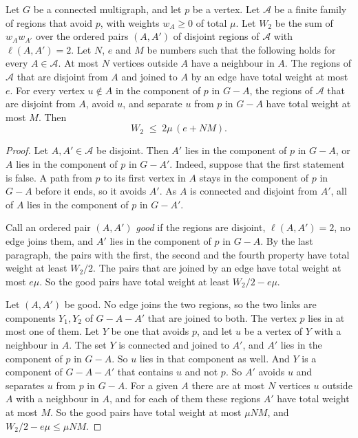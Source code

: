 \begin{lemma}\label{lem:sep}
Let $G$ be a connected multigraph, and let $p$ be a vertex. Let $\mathcal A$ be a finite family of
regions that avoid $p$, with weights $w_A\ge0$ of total $\mu$. Let $W_2$ be the sum of
$w_Aw_{A'}$ over the ordered pairs $(A,A')$ of disjoint regions of $\mathcal A$ with
$\ell(A,A')=2$. Let $N$, $e$ and $M$ be numbers such that the following holds for every
$A\in\mathcal A$. At most $N$ vertices outside $A$ have a neighbour in $A$. The regions of
$\mathcal A$ that are disjoint from $A$ and joined to $A$ by an edge have total weight at most
$e$. For every vertex $u\notin A$ in the component of $p$ in $G-A$, the regions of $\mathcal A$
that are disjoint from $A$, avoid $u$, and separate $u$ from $p$ in $G-A$ have total weight at
most $M$. Then
\[
  W_2\;\le\;2\mu\,(e+NM).
\]
\end{lemma}

\begin{proof}
Let $A,A'\in\mathcal A$ be disjoint. Then $A'$ lies in the component of $p$ in $G-A$, or $A$ lies
in the component of $p$ in $G-A'$. Indeed, suppose that the first statement is false. A path from
$p$ to its first vertex in $A$ stays in the component of $p$ in $G-A$ before it ends, so it avoids
$A'$. As $A$ is connected and disjoint from $A'$, all of $A$ lies in the component of $p$ in
$G-A'$.

Call an ordered pair $(A,A')$ \emph{good} if the regions are disjoint, $\ell(A,A')=2$, no edge
joins them, and $A'$ lies in the component of $p$ in $G-A$. By the last paragraph, the pairs with
the first, the second and the fourth property have total weight at least $W_2/2$. The pairs that
are joined by an edge have total weight at most $e\mu$. So the good pairs have total weight at
least $W_2/2-e\mu$.

Let $(A,A')$ be good. No edge joins the two regions, so the two links are components $Y_1,Y_2$ of
$G-A-A'$ that are joined to both. The vertex $p$ lies in at most one of them. Let $Y$ be one that
avoids $p$, and let $u$ be a vertex of $Y$ with a neighbour in $A$. The set $Y$ is connected and
joined to $A'$, and $A'$ lies in the component of $p$ in $G-A$. So $u$ lies in that component as
well. And $Y$ is a component of $G-A-A'$ that contains $u$ and not $p$. So $A'$ avoids $u$ and
separates $u$ from $p$ in $G-A$. For a given $A$ there are at most $N$ vertices $u$ outside $A$
with a neighbour in $A$, and for each of them these regions $A'$ have total weight at most $M$.
So the good pairs have total weight at most $\mu NM$, and $W_2/2-e\mu\le\mu NM$.
\end{proof}

